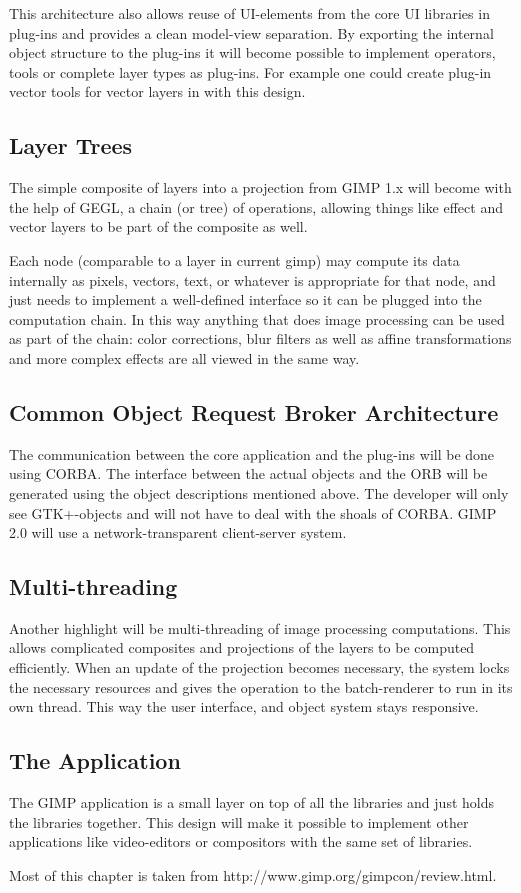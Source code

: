 This architecture also allows reuse of UI-elements from the core UI libraries
in plug-ins and provides a clean model-view separation. By exporting the
internal object structure to the plug-ins it will become possible to implement
operators, tools or complete layer types as plug-ins. For example one could
create plug-in vector tools for vector layers in with this design.

\subsection{Layer Trees}
 
The simple composite of layers into a projection from GIMP 1.x will become with
the help of GEGL, a chain (or tree) of operations, allowing things like effect
and vector layers to be part of the composite as well. 

Each node (comparable to a layer in current gimp) may compute its data
internally as pixels, vectors, text, or whatever is appropriate for that node,
and  just needs to implement a well-defined interface so it can be plugged into
the computation chain. In this way anything that does image processing
can be used as part of the chain: color corrections, blur filters as well as
affine transformations and more complex effects are all viewed in 
the same way.

\subsection{Common Object Request Broker Architecture}

The communication between the core application and the plug-ins will be done
using CORBA. The interface between the actual objects and the ORB will be
generated using the object descriptions mentioned above. The developer will
only see GTK+-objects and will not have to deal with the shoals of CORBA.  GIMP
2.0 will use a network-transparent client-server system.

\subsection{Multi-threading}

Another highlight will be multi-threading of image processing computations.
This allows complicated composites and projections of the layers to be computed
efficiently. When an update of the projection becomes necessary, the system
locks the necessary resources and gives the operation to the batch-renderer to
run in its own thread. This way the user interface, and object system stays
responsive.

\subsection{The Application}
The GIMP application is a small layer on top of all the libraries and just
holds the libraries together.  This design will make it possible to implement
other applications like video-editors or compositors with the same set of
libraries.

Most of this chapter is taken from http://www.gimp.org/gimpcon/review.html.
 
